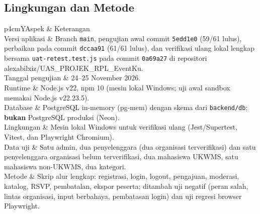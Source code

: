 \documentclass[11pt,a4paper]{article}
\newcommand{\tbl}[2]{\par\smallskip\noindent\begin{tabularx}{\linewidth}{#1}\toprule #2\bottomrule\end{tabularx}\par\smallskip}
\begin{document}
\subsection{Lingkungan dan Metode}
\tbl{p{4cm}Y}{Aspek & Keterangan\\\midrule
Versi aplikasi & Branch \texttt{main}, pengujian awal commit \texttt{5edd1e0} (59/61 lulus), perbaikan pada commit \texttt{dccaa91} (61/61 lulus), dan verifikasi ulang lokal lengkap bersama \texttt{uat-retest.test.js} pada commit \texttt{0a69a27} di repositori alexabilxiz/UAS\_PROJEK\_RPL\_EventKu.\\
Tanggal pengujian & 24--25 November 2026.\\
Runtime & Node.js v22, npm 10 (mesin lokal Windows; uji awal sandbox memakai Node.js v22.23.5).\\
Database & PostgreSQL in-memory (pg-mem) dengan skema dari \texttt{backend/db}; \textbf{bukan} PostgreSQL produksi (Neon).\\
Lingkungan & Mesin lokal Windows untuk verifikasi ulang (Jest/Supertest, Vitest, dan Playwright Chromium).\\
Data uji & Satu admin, dua penyelenggara (dua organisasi terverifikasi) dan satu penyelenggara organisasi belum terverifikasi, dua mahasiswa UKWMS, satu mahasiswa non-UKWMS, dua kategori.\\
Metode & Skrip alur lengkap: registrasi, login, logout, pengajuan, moderasi, katalog, RSVP, pembatalan, ekspor peserta; ditambah uji negatif (peran salah, lintas organisasi, input berbahaya, pembatasan login) dan uji regresi browser Playwright.\\}
\end{document}
